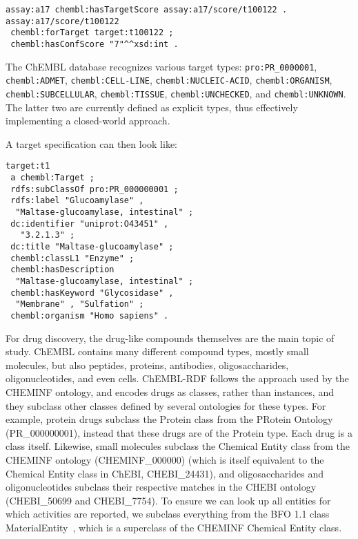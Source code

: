 \documentclass[10pt]{bmc_article}
\newenvironment{bmcformat}{\begin{raggedright}\baselineskip20pt\sloppy\setboolean{publ}{false}}{\end{raggedright}\baselineskip20pt\sloppy}
\begin{document}
\begin{bmcformat}
\begin{small}
\begin{verbatim}
assay:a17 chembl:hasTargetScore assay:a17/score/t100122 .
assay:a17/score/t100122
 chembl:forTarget target:t100122 ;
 chembl:hasConfScore "7"^^xsd:int .  
\end{verbatim}
\end{small}

The ChEMBL database
recognizes various target types: \verb+pro:PR_0000001+, \verb+chembl:ADMET+, \verb+chembl:CELL-LINE+,
\verb+chembl:NUCLEIC-ACID+, \verb+chembl:ORGANISM+, \verb+chembl:SUBCELLULAR+, \verb+chembl:TISSUE+,
\verb+chembl:UNCHECKED+, and \verb+chembl:UNKNOWN+. The latter two are currently defined as
explicit types, thus effectively implementing a closed-world approach. 

A target specification can then look like:

\begin{small}
\begin{verbatim}
target:t1
 a chembl:Target ;
 rdfs:subClassOf pro:PR_000000001 ;
 rdfs:label "Glucoamylase" , 
  "Maltase-glucoamylase, intestinal" ;
 dc:identifier "uniprot:O43451" ,
   "3.2.1.3" ;
 dc:title "Maltase-glucoamylase" ;
 chembl:classL1 "Enzyme" ;
 chembl:hasDescription
  "Maltase-glucoamylase, intestinal" ;
 chembl:hasKeyword "Glycosidase" , 
  "Membrane" , "Sulfation" ;
 chembl:organism "Homo sapiens" .
\end{verbatim}
\end{small}

For drug discovery, the drug-like compounds themselves are the main topic of study.
ChEMBL contains many different compound types, mostly small molecules,
but also peptides, proteins, antibodies, oligosaccharides, oligonucleotides, and
even cells. ChEMBL-RDF follows the approach used by the CHEMINF ontology,
and encodes drugs as classes, rather than instances, and they subclass
other classes defined by several ontologies for these types. For example, protein drugs subclass the
Protein class from the PRotein Ontology (PR\_000000001), instead that these drugs are
of the Protein type. Each drug is a class itself. Likewise, small
molecules subclass the Chemical Entity class from the CHEMINF
ontology (CHEMINF\_000000) (which is itself equivalent to the Chemical Entity class in ChEBI, CHEBI\_24431), 
and oligosaccharides and oligonucleotides
subclass their respective matches in the CHEBI ontology (CHEBI\_50699
and CHEBI\_7754). To ensure we can look up all entities for which activities
are reported, we subclass everything from the BFO 1.1 class MaterialEntity~\cite{Smith2004},
which is a superclass of the CHEMINF Chemical Entity class.


\end{bmcformat}
\end{document}
